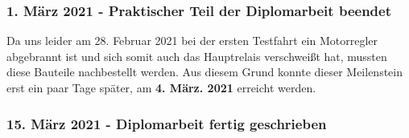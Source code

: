 \subsubsection*{1. März 2021 - Praktischer Teil der Diplomarbeit beendet}
Da uns leider am 28. Februar 2021 bei der ersten Testfahrt ein Motorregler abgebrannt ist und sich somit auch das Hauptrelais verschweißt hat, mussten
diese Bauteile nachbestellt werden. Aus diesem Grund konnte dieser Meilenstein erst ein paar Tage später, am \textbf{4. März. 2021} erreicht werden.  

\subsubsection*{15. März 2021 - Diplomarbeit fertig geschrieben}

